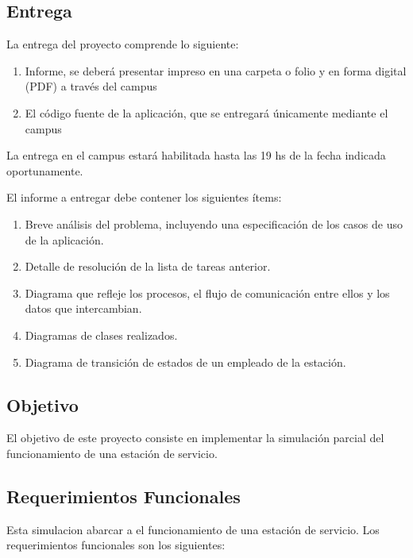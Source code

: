 \documentclass[12pt,a4paper,titlepage,oneside]{article}
\begin{document}
\subsection{Entrega} 

La entrega del proyecto comprende lo siguiente:

\begin{enumerate}
\item
Informe, se deberá presentar impreso en una carpeta o folio y en forma digital (PDF) a través del campus
\item
El código fuente de la aplicación, que se entregará únicamente mediante el campus
\end{enumerate}

La entrega en el campus estará habilitada hasta las 19 hs de la fecha indicada oportunamente.

El informe a entregar debe contener los siguientes ítems:

\begin{enumerate}
\item
Breve análisis del problema, incluyendo una especificación de los casos de uso de la aplicación.
\item
Detalle de resolución de la lista de tareas anterior.
\item
Diagrama que refleje los procesos, el flujo de comunicación entre ellos y los datos que intercambian.
\item
Diagramas de clases realizados.
\item
Diagrama de transición de estados de un empleado de la estación.
\end{enumerate}

\subsection{Objetivo}

El objetivo de este proyecto consiste en implementar la simulación parcial del funcionamiento de una estación de servicio.

\subsection{Requerimientos Funcionales}

Esta simulacion abarcar a el funcionamiento de una estación de servicio. Los requerimientos funcionales son los siguientes:
\end{document}
